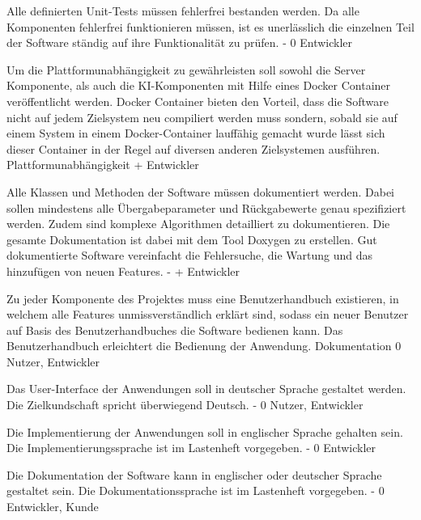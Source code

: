         {Alle definierten Unit-Tests müssen fehlerfrei bestanden werden.}
        {Da alle Komponenten fehlerfrei funktionieren müssen, ist es unerlässlich die einzelnen Teil der Software ständig auf ihre Funktionalität zu prüfen.}
        {-}
        {0}
        {Entwickler}

        {Um die Plattformunabhängigkeit zu gewährleisten soll sowohl die Server Komponente, als auch die KI-Komponenten mit Hilfe eines Docker Container veröffentlicht werden.}
        {Docker Container bieten den Vorteil, dass die Software nicht auf jedem Zielsystem neu compiliert werden muss sondern, sobald sie auf einem System in einem Docker-Container lauffähig gemacht wurde lässt sich dieser Container in der Regel auf diversen anderen Zielsystemen ausführen.}
        {Plattformunabhängigkeit}
        {+}
        {Entwickler}

        {Alle Klassen und Methoden der Software müssen dokumentiert werden. Dabei sollen mindestens alle Übergabeparameter und Rückgabewerte genau spezifiziert werden. Zudem sind komplexe Algorithmen detailliert zu dokumentieren. Die gesamte Dokumentation ist dabei mit dem Tool Doxygen zu erstellen.}
        {Gut dokumentierte Software vereinfacht die Fehlersuche, die Wartung und das hinzufügen von neuen Features.}
        {-}
        {+}
        {Entwickler}

        {Zu jeder Komponente des Projektes muss eine Benutzerhandbuch existieren, in welchem alle Features unmissverständlich erklärt sind, sodass ein neuer Benutzer auf Basis des Benutzerhandbuches die Software bedienen kann.}
        {Das Benutzerhandbuch erleichtert die Bedienung der Anwendung.}
        {Dokumentation}
        {0}
        {Nutzer, Entwickler}

        {Das User-Interface der Anwendungen soll in deutscher Sprache gestaltet werden.}
        {Die Zielkundschaft spricht überwiegend Deutsch.}
        {-}
        {0}
        {Nutzer, Entwickler}

        {Die Implementierung der Anwendungen soll in englischer Sprache gehalten sein.}
        {Die Implementierungssprache ist im Lastenheft vorgegeben.}
        {-}
        {0}
        {Entwickler}

        {Die Dokumentation der Software kann in englischer oder deutscher Sprache gestaltet sein.}
        {Die Dokumentationssprache ist im Lastenheft vorgegeben.}
        {-}
        {0}
        {Entwickler, Kunde}

